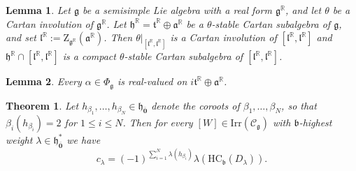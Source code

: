 \documentclass[10pt,a4paper]{amsart}
\newtheorem{lem}{Lemma}
\newtheorem{thm}{Theorem}
\newcommand{\Centre}{\mathrm Z}
\newcommand{\HC}{\mathrm{HC}}
\newcommand{\Irr}{\mathrm{Irr}}
\newcommand{\R}{\mathbb R}
\newcommand{\catC}{\mathscr C}
\newcommand{\eev}{{\oline{\mathbf{0}}}}
\newcommand{\g}{\mathfrak}
\newcommand{\oline}{\overline}
\begin{document}
\begin{lem}
\label{lem:Z(a)has-cpct-Cartan}
Let $\g g$ be a semisimple Lie algebra with a real form $\g g^\R$, and let $\theta$ be a Cartan involution of $\g g^\R$.  Let $\g h^\R=\g t^\R\oplus\g a^\R$ be a $\theta$-stable Cartan subalgebra of $\g g$, and set $\g l^\R:=\Centre_{\g g^\R}(\g a^\R)$. Then $\theta|_{[\g l^\R,\g l^\R]}$ is a Cartan involution of $[\g l^\R,\g l^\R]$ and $\g h^\R\cap [\g l^\R,\g l^\R]$ is  a compact $\theta$-stable Cartan subalgebra of $[\g l^\R,\g l^\R]$. %
\end{lem}

\begin{lem}
\label{lem:roots-real-on-a}
 Every $\alpha\in\Phi_\g g$ is real-valued on $i\g t^\R\oplus \g a^\R$. 
\end{lem}

\begin{thm}
\label{thm:alternateclam}
Let $h_{\beta_1},\ldots,h_{\beta_N}\in\g h_\eev$ denote the coroots of $\beta_1,\ldots,\beta_N$, so that $\beta_i(h_{\beta_i})=2$ for $1\leq i\leq N$. Then for every $[W]\in\Irr(\catC_\g g)$  with $\g b$-highest weight $\lambda\in\g h_\eev^*$ we have 
 \[
 c_\lambda=(-1)^{\sum_{i=1}^N\lambda(h_{\beta_i})}\lambda(\HC_\g b(D_\lambda)).
 \]
\end{thm}
\end{document}
